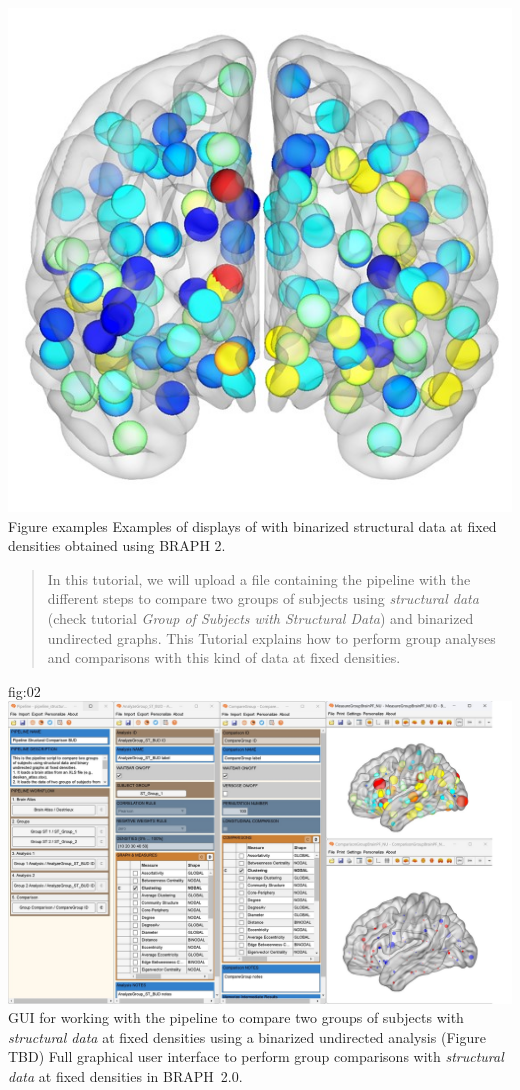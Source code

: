 \documentclass[justified]{tufte-handout}
\begin{document}
{	\includegraphics{fig_01_03.jpg}
	}
	{Figure examples}
	{
	Examples of displays of  with binarized structural data at fixed densities obtained using BRAPH 2.
	}
 
\begin{abstract}
\noindent
In this tutorial, we will upload a file containing the pipeline with the different steps to compare two groups of subjects using \emph{structural data} (check tutorial \emph{Group of Subjects with Structural Data}) and binarized undirected graphs. This Tutorial explains how to perform group analyses and comparisons with this kind of data at fixed densities.
\end{abstract}

\tableofcontents

	{fig:02}
	{\includegraphics{fig02.jpg}}
	{GUI for working with the pipeline to compare two groups of subjects with \emph{structural data} at fixed densities using a binarized undirected analysis (Figure TBD)}
	{
	Full graphical user interface to perform group comparisons with \emph{structural data} at fixed densities in BRAPH~2.0. 
	}
\end{document}

